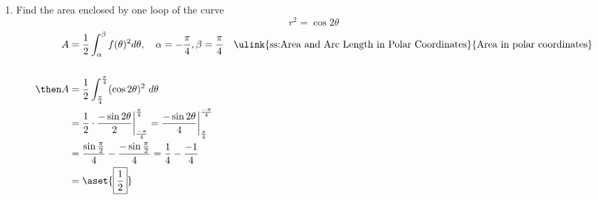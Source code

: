\begin{enumerate}
  \item Find the area enclosed by one loop of the curve
    \[%
    r^2 = \cos 2\theta
    \]%
    \begin{align*}
      A &= \frac{1}{2} \int_{\alpha}^{\beta} f(\theta)^2 d\theta, \quad \alpha = -\frac{\pi}{4}, \beta = \frac{\pi}{4}
        &&  \text{\ulink{ss:Area and Arc Length in Polar Coordinates}{Area in polar coordinates}} \\
        \\
      \then A &= \frac{1}{2} \int_{\frac{\pi}{4}}^{\frac{\pi}{4}} (\cos 2 \theta)^2 ~d\theta \\
              &= \frac{1}{2}\cdot\frac{-\sin 2 \theta}{2} \bigg|_{\frac{-\pi}{4}}^{\frac{\pi}{4}}
               = \frac{-\sin 2 \theta}{4} \bigg|_{\frac{\pi}{4}}^{\frac{-\pi}{4}} \\
              &= \frac{\sin \frac{\pi}{2}}{4} - \frac{-\sin \frac{\pi}{2}}{4}
              = \frac{1}{4} - \frac{-1}{4} \\
              &= \aset{\boxed{\frac{1}{2}}}
    \end{align*}

\end{enumerate}
